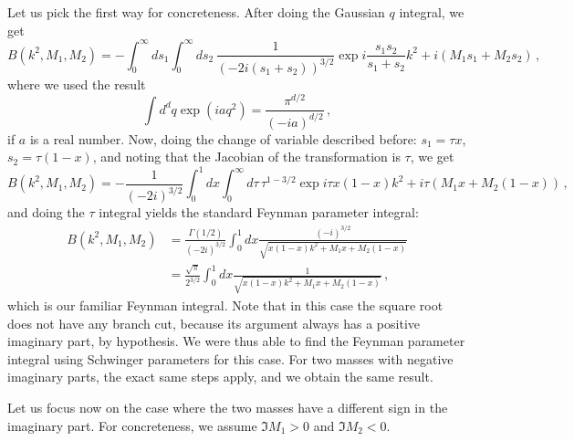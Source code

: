\documentclass[twoside]{article}
\begin{document}
Let us pick the first way for concreteness. After doing the Gaussian $q$ integral, we get
\begin{equation}
B(k^2,M_1,M_2)= - \int_0^\infty ds_1 \int_0^\infty ds_2\,\frac{1}{(-2 i(s_1+s_2))^{3/2}} \exp{i\frac{s_1 s_2}{s_1+s_2}k^2+ i (M_1 s_1 +M_2 s_2)}\,,
\end{equation}
where we used the result
\begin{equation}
\label{eq:gauss}
\int d^d q \exp(i a q^2) = \frac{\pi^{d/2}}{(-i a)^{d/2}}\,,
\end{equation}
if $a$ is a real number.
Now, doing the change of variable described before: $s_1 = \tau x$, $s_2 = \tau (1-x)$, and noting that the Jacobian of the transformation is $\tau$, we get
\begin{equation}
B(k^2,M_1,M_2)= - \frac{1}{(-2 i)^{3/2}} \int_0^1 dx \int_0^\infty d\tau\, \tau^{1-3/2}  \exp{i \tau x (1-x)k^2+ i \tau (M_1 x +M_2 (1-x))}\,,
\end{equation}
and doing the $\tau$ integral yields the standard Feynman parameter integral:
\begin{align}
B(k^2,M_1,M_2)&= \frac{\Gamma(1/2)}{(-2 i)^{3/2}} \int_0^1 dx \frac{(-i)^{3/2}}{\sqrt{x (1-x)k^2+ M_1 x +M_2 (1-x)}}\\
& = \frac{\sqrt{\pi}}{2^{3/2}} \int_0^1 dx \frac{1}{\sqrt{x (1-x)k^2+ M_1 x +M_2 (1-x)}} \,,
\end{align}
which is our familiar Feynman integral. Note that in this case the square root does not have any branch cut, because its argument always has a positive imaginary part, by hypothesis. We were thus able to find the Feynman parameter integral using Schwinger parameters for this case. For two masses with negative imaginary parts, the exact same steps apply, and we obtain the same result.

Let us focus now on the case where the two masses have a different sign in the imaginary part. For concreteness, we assume $\Im M_1 > 0$ and $\Im M_2 < 0$.
\end{document}
